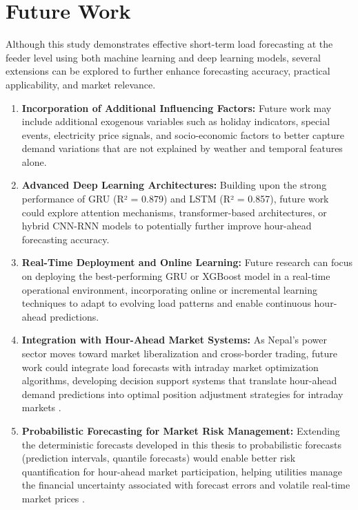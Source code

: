 \documentclass[oneside, 12pt]{book}
\numberwithin{equation}{chapter}
\newcommand{\sizexii}{\fontsize{12pt}{6pt}\selectfont}
\begin{document}
\section{\sizexii Future Work}

Although this study demonstrates effective short-term load forecasting at the feeder level using both machine learning and deep learning models, several extensions can be explored to further enhance forecasting accuracy, practical applicability, and market relevance.

\begin{enumerate}
    \item \textbf{Incorporation of Additional Influencing Factors:} Future work may include additional exogenous variables such as holiday indicators, special events, electricity price signals, and socio-economic factors to better capture demand variations that are not explained by weather and temporal features alone.
    
    \item \textbf{Advanced Deep Learning Architectures:} Building upon the strong performance of GRU (R² = 0.879) and LSTM (R² = 0.857), future work could explore attention mechanisms, transformer-based architectures, or hybrid CNN-RNN models to potentially further improve hour-ahead forecasting accuracy.
    
    \item \textbf{Real-Time Deployment and Online Learning:} Future research can focus on deploying the best-performing GRU or XGBoost model in a real-time operational environment, incorporating online or incremental learning techniques to adapt to evolving load patterns and enable continuous hour-ahead predictions.
    
    \item \textbf{Integration with Hour-Ahead Market Systems:} As Nepal's power sector moves toward market liberalization and cross-border trading, future work could integrate load forecasts with intraday market optimization algorithms, developing decision support systems that translate hour-ahead demand predictions into optimal position adjustment strategies for intraday markets \parencite{conejo2010decision}.
    
    \item \textbf{Probabilistic Forecasting for Market Risk Management:} Extending the deterministic forecasts developed in this thesis to probabilistic forecasts (prediction intervals, quantile forecasts) would enable better risk quantification for hour-ahead market participation, helping utilities manage the financial uncertainty associated with forecast errors and volatile real-time market prices \parencite{weron2014electricity}.
\end{enumerate}
\end{document}
